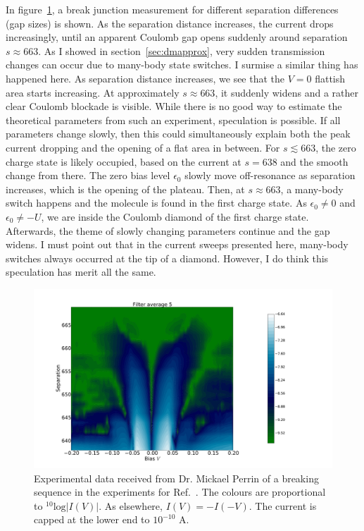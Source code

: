 In figure~\ref{fig:perrindata}, a break junction measurement for different separation differences (gap sizes) is shown. As the separation distance increases, the current drops increasingly, until an apparent Coulomb gap opens suddenly around separation $s \approx 663$. As I showed in section~\ref{sec:dmapprox}, very sudden transmission changes can occur due to many-body state switches. I surmise a similar thing has happened here. As separation distance increases, we see that the $V=0$ flattish area starts increasing. At approximately $s\approx 663$, it suddenly widens and a rather clear Coulomb blockade is visible. While there is no good way to estimate the theoretical parameters from such an experiment, speculation is possible. If all parameters change slowly, then this could simultaneously explain both the peak current dropping and the opening of a flat area in between. For $s \lesssim 663$, the zero charge state is likely occupied, based on the current at $s = 638$ and the smooth change from there. The zero bias level $\epsilon_0$ slowly move off-resonance as separation increases, which is the opening of the plateau. Then, at $s \approx 663$, a many-body switch happens and the molecule is found in the first charge state. As $\epsilon_0 \neq 0 $ and $\epsilon_0 \neq -U$, we are inside the Coulomb diamond of the first charge state. Afterwards, the theme of slowly changing parameters continue and the gap widens. I must point out that in the current sweeps presented here, many-body switches always occurred at the tip of a diamond. However, I do think this speculation has merit all the same.
\begin{figure}[htb]
    \centering
    \includegraphics[width=.99\textwidth,clip=true, trim=4cm 0cm 10cm 4cm]{pdf/perrin_experiment_abs.pdf}
    \caption{Experimental data received from Dr. Mickael Perrin of a breaking sequence in the experiments for Ref.~\citet{perrinnano}. The colours are proportional to $^{10}\text{log}\left|I(V)\right|$. As elsewhere, $I(V) = -I(-V)$. The current is capped at the lower end to $10^{-10}$ A.}
    \label{fig:perrindata}
\end{figure}

